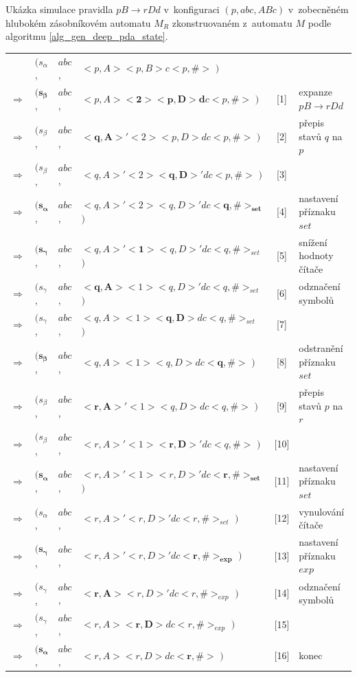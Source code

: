 \begin{Example}
\setlength{\tabcolsep}{\deftabcolsep}

\newpage
Ukázka simulace pravidla $pB \rightarrow r Dd$ v~konfiguraci $(p, abc, ABc)$ v~zobecněném hlubokém zásobníkovém automatu $M_{R}$ zkonstruovaném z~automatu $M$ podle algoritmu \ref{alg_gen_deep_pda_state}.\bigskip

\begin{tabular}{llllc|l}
                & $( s_{\alpha}$,  & $abc$, & $<p,A> <p,B> c <p, \#>$         $)$ & &  \\
$\Rightarrow$   & $( \mathbf{s_{\beta}}$,   & $abc$, & $<p,A> \mathbf{<2> <p,D> d} c <p, \#>$   $)$ & [1] & expanze $pB \rightarrow r Dd$ \\
$\Rightarrow$   & $( s_{\beta}$,   & $abc$, & $\mathbf{<q,A>'} <2> <p,D> d c <p, \#>$         $)$  & [2] & přepis stavů $q$ na $p$\\
$\Rightarrow$   & $( s_{\beta}$,   & $abc$, & $<q,A>' <2> \mathbf{<q,D>'} d c <p, \#>$         $)$  & [3] & \\
$\Rightarrow$   & $( \mathbf{s_{\alpha}}$,   & $abc$, & $<q,A>' <2> <q,D>' d c \mathbf{<q, \#>_{set}}$         $)$  & [4] & nastavení příznaku $set$\\
$\Rightarrow$   & $( \mathbf{s_{\gamma}}$,  & $abc$, & $<q,A>' \mathbf{<1>} <q,D>' d c <q, \#>_{set}$  $)$  & [5] & snížení hodnoty čítače \\
$\Rightarrow$   & $( s_{\gamma}$,  & $abc$, & $\mathbf{<q,A>} <1> <q,D>' d c <q, \#>_{set}$  $)$  & [6] & odznačení symbolů \\
$\Rightarrow$   & $( s_{\gamma}$,  & $abc$, & $<q,A> <1> \mathbf{<q,D>} d c <q, \#>_{set}$  $)$  & [7] &  \\
$\Rightarrow$   & $( \mathbf{s_{\beta}}$,  & $abc$, & $<q,A> <1> <q,D> d c \mathbf{<q, \#>}$  $)$  & [8] &  odstranění příznaku $set$\\
$\Rightarrow$   & $( s_{\beta}$,  & $abc$, & $\mathbf{<r,A>'} <1> <q,D> d c <q, \#>$  $)$  & [9] &  přepis stavů $p$ na $r$\\
$\Rightarrow$   & $( s_{\beta}$,  & $abc$, & $<r,A>' <1> \mathbf{<r,D>'} d c <q, \#>$  $)$  & [10] &  \\
$\Rightarrow$   & $( \mathbf{s_{\alpha}}$,  & $abc$, & $<r,A>' <1> <r,D>' d c \mathbf{<r, \#>_{set}}$  $)$  & [11] &  nastavení příznaku $set$\\
$\Rightarrow$   & $( s_{\alpha}$,  & $abc$, & $<r,A>' <r,D>' d c <r, \#>_{set}$  $)$  & [12] &  vynulování čítače\\
$\Rightarrow$   & $( \mathbf{s_{\gamma}}$,  & $abc$, & $<r,A>' <r,D>' d c \mathbf{<r, \#>_{exp}}$  $)$  & [13] &  nastavení příznaku $exp$\\
$\Rightarrow$   & $( s_{\gamma}$,  & $abc$, & $\mathbf{<r,A>} <r,D>' d c <r, \#>_{exp}$  $)$  & [14] &  odznačení symbolů\\
$\Rightarrow$   & $( s_{\gamma}$,  & $abc$, & $<r,A> \mathbf{<r,D>} d c <r, \#>_{exp}$  $)$  & [15] &  \\
$\Rightarrow$   & $( \mathbf{s_{\alpha}}$,  & $abc$, & $<r,A> <r,D> d c \mathbf{<r, \#>}$  $)$  & [16] &  konec


\end{tabular}
\end{Example}
